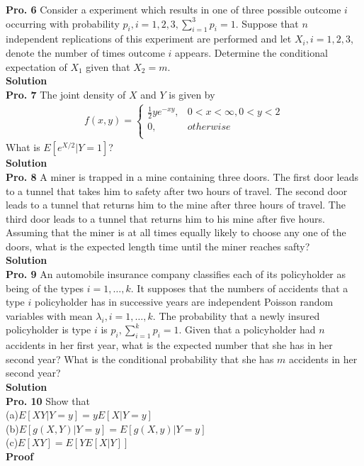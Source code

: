 \documentclass[12pt,onecolumn,journal]{IEEEtran}
\begin{document}
\textbf{Pro. 6} Consider a experiment which results in one of three possible outcome $i$ occurring with probability $p_i,i=1,2,3,\sum^3_{i=1}{p_i}=1$. Suppose that $n$ independent replications of this experiment are performed and let $X_i,i=1,2,3$, denote the number of times outcome $i$ appears. Determine the conditional expectation of $X_1$ given that $X_2=m$.
\\
\textbf{Solution}
\\


\textbf{Pro. 7} The joint density of $X$ and $Y$ is given by
\begin{eqnarray*}%
f(x,y)=
               \begin{cases}
                \frac{1}{2}ye^{-xy},    & 0<x<\infty,0<y<2 \\
                 0,  & otherwise\\
               \end{cases}
\end{eqnarray*}
What is $E[e^{X/2}|Y=1]$?
\\
\textbf{Solution}
\\

\textbf{Pro. 8} A miner is trapped in a mine containing three doors. The first door leads to a tunnel that takes him to safety after two hours of travel. The second door leads to a tunnel that returns him to the mine after three hours of travel. The third door leads to a tunnel that returns him to his mine after five hours. Assuming that the miner is at all times equally likely to choose any one of the doors, what is the expected length time until the miner reaches safty?
\\
\textbf{Solution}
\\

\textbf{Pro. 9} An automobile insurance company classifies each of its policyholder as being of the types $i=1,\ldots,k$. It supposes that the numbers of accidents that a type $i$ policyholder has in successive years are independent Poisson random variables with mean $\lambda_i,i=1,\ldots,k$. The probability that a newly insured policyholder is type $i$ is $p_i,\sum^k_{i=1}{p_i}=1$. Given that a policyholder had $n$ accidents in her first year, what is the expected number that she has in her second year? What is the conditional probability that she has $m$ accidents in her second year?\\
\textbf{Solution}
\\

\textbf{Pro. 10} Show that\\
\quad\quad(a)$E[XY|Y=y]=yE[X|Y=y]$\\
\quad\quad(b)$ E[g(X,Y)|Y=y]=E[g(X,y)|Y=y]$\\
\quad\quad(c)$ E[XY]=E[YE[X|Y]]$\\
\textbf{Proof}
\end{document}
